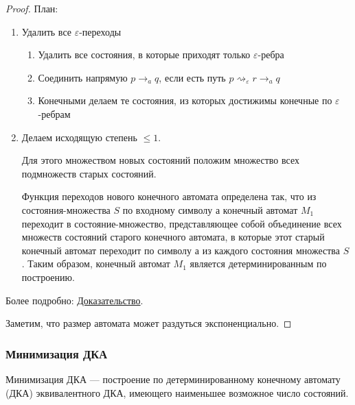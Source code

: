\begin{proof}
	План:
	\begin{enumerate}
		\item Удалить все $\varepsilon$-переходы
		\begin{enumerate}[a]
			\item Удалить все состояния, в которые приходят только $\varepsilon$-ребра
			\item Соединить напрямую $p \rightarrow_a q$, если есть путь $p \rightsquigarrow_\varepsilon r \rightarrow_a q$
			\item Конечными делаем те состояния, из которых достижимы конечные по $\varepsilon$-ребрам
		\end{enumerate}
		\item Делаем исходящую степень $\leq 1$.
		
		Для этого множеством новых состояний положим множество всех подмножеств старых состояний. 
		
		Функция переходов нового конечного автомата определена так, что из состояния-множества $S$ по входному символу $а$ конечный автомат $M_1$ переходит в состояние-множество, представляющее собой объединение всех множеств состояний старого конечного автомата, в которые этот старый конечный автомат переходит по символу $а$ из каждого состояния множества $S$. Таким образом, конечный автомат $M_1$ является детерминированным по построению.
	\end{enumerate}

	Более подробно:  \href{http://mathhelpplanet.com/static.php?p=determinizatsiya-konechnykh-avtomatov}{Доказательство}.
	
	Заметим, что размер автомата может раздуться экспоненциально. 
\end{proof}

\subsubsection{Минимизация ДКА}

Минимизация ДКА — построение по детерминированному конечному автомату (ДКА) эквивалентного ДКА, имеющего наименьшее возможное число состояний. 


